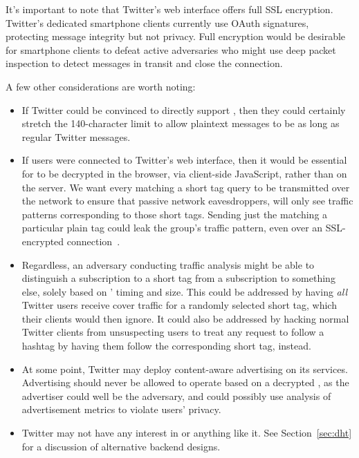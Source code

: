 It's important to note that Twitter's web interface offers full SSL encryption. Twitter's dedicated smartphone clients currently use OAuth signatures, protecting message integrity but not privacy. Full encryption would be desirable for smartphone clients to defeat active adversaries who might use deep packet inspection to detect \hoot messages in transit and close the connection.

A few other considerations are worth noting:
\begin{itemize}
\item If Twitter could be convinced to directly support \hoot, then they could certainly stretch the 140-character limit to allow \hoot plaintext messages to be as long as regular Twitter messages.

\item If \hoot users were connected to Twitter's web interface, then it would be essential for \msgs to be decrypted in the browser, via client-side JavaScript, rather than on the server. We want every \msg matching a short tag query to be transmitted over the network to ensure that passive network eavesdroppers, will only see traffic patterns corresponding to those short tags. Sending just the \msgs matching a particular plain tag could leak the group's traffic pattern, even over an SSL-encrypted connection~\cite{liberatore06}.


\item Regardless, an adversary conducting traffic analysis might be able to distinguish a subscription to a \hoot short tag from a subscription to something else, solely based on \msgs' timing and size. This could be addressed by having {\em all} Twitter users receive \hoot cover traffic for a randomly selected \hoot short tag, which their clients would then ignore. It could also be addressed by hacking normal Twitter clients from unsuspecting users to treat any request to follow a hashtag by having them follow the corresponding \hoot short tag, instead.

\item At some point, Twitter may deploy content-aware advertising on its services. Advertising should never be allowed to operate based on a decrypted \hoot, as the advertiser could well be the adversary, and could possibly use analysis of advertisement metrics to violate \hoot users' privacy.

\item Twitter may not have any interest in \hoot or anything like it. See Section~\ref{sec:dht} for a discussion of alternative backend designs.

\end{itemize}



